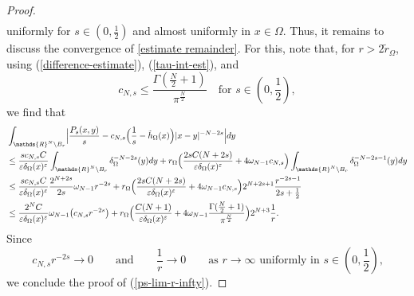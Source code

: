 \documentclass[notitlepage,11pt,reqno]{amsart}
\theoremstyle{definition}
\numberwithin{equation}{section}
\newcommand{\RR}{\mathds{R}}
\begin{document}
\begin{proof}
\begin{align*}
\end{align*}
uniformly for $s\in(0,\frac12)$ and almost uniformly in $x\in \Omega$. Thus, it remains to discuss the convergence of \eqref{estimate remainder}. For this, note that, for $r > 2 \tilde r_\Omega $, using (\ref{difference-estimate}), (\ref{tau-int-est}), and \[c_{N, s}\leq \frac{\Gamma(\frac{N}{2}+1)}{\pi^{\frac{N}{2}}} \quad \text{for $s \in (0, \frac{1}{2})$},\] we find that 
\begin{align*}
  &\int_{\RR^N  \setminus B_{r}} \Bigl|\frac{P_s(x,y)}{s}-c_{N,s}\Bigl(\frac{1}{s} - \tilde h_\Omega(x)\Bigr) |x-y|^{-N-2s}\Bigr|dy\\
  &\le \frac{s c_{N,s}C}{\varepsilon \delta_{\Omega}(x)^{\varepsilon}} \int_{\RR^N  \setminus B_{r}} \delta^{-N-2s}_\Omega(y)dy
    + r_{\Omega} \Bigl(\frac{2 sC (N+2s)}{\varepsilon \delta_{\Omega}(x)^{\varepsilon}}+ 4 \omega_{N-1} c_{N,s} \Bigr)\int_{\RR^N  \setminus B_{r}} \delta_\Omega^{-N-2s-1}(y)dy\\
  &\le \frac{s c_{N,s}C}{\varepsilon \delta_{\Omega}(x)^{\varepsilon}}
 \frac{2^{N+2s}}{2s}\omega_{N-1}r^{-2s} 
    + r_{\Omega} \Bigl(\frac{2 s C (N+2s)}{\varepsilon \delta_{\Omega}(x)^{\varepsilon}}+ 4 \omega_{N-1} c_{N,s} \Bigr)2^{N+2s+1} \frac{r^{-2s-1}}{2s+\frac{1}{2}}\\
  &\le   \frac{2^{N}C}{\varepsilon \delta_{\Omega}(x)^{\varepsilon}}\omega_{N-1} \bigl(c_{N,s}r^{-2s}\bigr)
    + r_{\Omega} \Bigl(\frac{ C (N+1)}{\varepsilon \delta_{\Omega}(x)^{\varepsilon}}+ 4\omega_{N-1} \frac{\Gamma(\frac{N}{2}+1)}{\pi^{\frac{N}{2}}} \Bigr)2^{N+3} \frac{1}{r}.
\end{align*}
Since
$$
c_{N,s}r^{-2s}  \to 0 \qquad \text{and}\qquad \frac{1}{r} \to 0 \qquad \text{as $r \to \infty$ uniformly in $s \in (0,\frac{1}{2})$,}
$$
we conclude the proof of (\ref{ps-lim-r-infty}).  
\end{proof}
\end{document}
